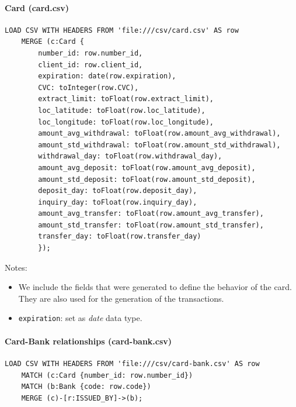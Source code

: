 \begin{itemize}
\paragraph{Card (card.csv)}

\begin{center}
\lstset{style=cypherStyle}
\begin{lstlisting}[caption={card.csv}]
    LOAD CSV WITH HEADERS FROM 'file:///csv/card.csv' AS row
	MERGE (c:Card {
		number_id: row.number_id, 
		client_id: row.client_id, 
		expiration: date(row.expiration), 
		CVC: toInteger(row.CVC), 
		extract_limit: toFloat(row.extract_limit), 
		loc_latitude: toFloat(row.loc_latitude), 
		loc_longitude: toFloat(row.loc_longitude),
		amount_avg_withdrawal: toFloat(row.amount_avg_withdrawal),
		amount_std_withdrawal: toFloat(row.amount_std_withdrawal),
		withdrawal_day: toFloat(row.withdrawal_day),
		amount_avg_deposit: toFloat(row.amount_avg_deposit),
		amount_std_deposit: toFloat(row.amount_std_deposit),
		deposit_day: toFloat(row.deposit_day),
		inquiry_day: toFloat(row.inquiry_day),
		amount_avg_transfer: toFloat(row.amount_avg_transfer),
		amount_std_transfer: toFloat(row.amount_std_transfer),
		transfer_day: toFloat(row.transfer_day)
		});
\end{lstlisting}
\end{center}

Notes:
\begin{itemize}
    \item We include the fields that were generated to define the behavior of the card. They are also used for the generation of the transactions.
    \item \texttt{expiration}: set as \textit{date} data type.
\end{itemize}

\paragraph{Card-Bank relationships (card-bank.csv)}

\begin{center}
\lstset{style=cypherStyle}
\begin{lstlisting}[caption={card-bank.csv}]
    LOAD CSV WITH HEADERS FROM 'file:///csv/card-bank.csv' AS row
    MATCH (c:Card {number_id: row.number_id})
    MATCH (b:Bank {code: row.code})
    MERGE (c)-[r:ISSUED_BY]->(b);
\end{lstlisting}
\end{center}


\end{itemize}
